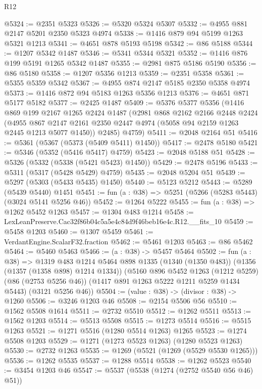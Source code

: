 \begin{lexlean}{R12}
\begin{coremodule}
@5324 := @2351 @5323
@5326 := @5320 @5324 @5307
@5332 := @4955 @881 @2147 @5201 @2350 @5323 @4974
@5338 := @1416 @879 @94 @5199 @1263 @5321 @1213
@5341 := @4651 @878 @5193 @5198
@5342 := @86 @5188
@5344 := @1207 @5342 @1487
@5346 := @5341 @5344 @5321
@5352 := @1416 @876 @199 @5191 @1265 @5342 @1487
@5355 := @2981 @875 @5186 @5190
@5356 := @86 @5180
@5358 := @1207 @5356 @1213
@5359 := @2351 @5358
@5361 := @5355 @5359 @5342
@5367 := @4955 @874 @2147 @5185 @2350 @5358 @4974
@5373 := @1416 @872 @94 @5183 @1263 @5356 @1213
@5376 := @4651 @871 @5177 @5182
@5377 := @2425 @1487
@5409 := @5376
    @5377
    @5356
    (@1416
      @869
      @199
      @2167
      @1265
      @2424
      @1487
      (@2981
        @868
        @2162
        @2166
        @2448
        @2424
        (@4955 @867 @2147 @2161 @2350 @2447 @4974 (@5058 @94 @2159 @1263 @2445 @1213 @5077 @1450))
        @2485)
      @4759)
@5411 := @2048 @2164 @51
@5416 := @5361 (@5367 (@5373 (@5409 @5411) @1450))
@5417 := @2478 @5180
@5421 := @5346 (@5352 (@5416 @5417) @4759)
@5423 := @2048 @5188 @51
@5428 := @5326 (@5332 (@5338 (@5421 @5423) @1450))
@5429 := @2478 @5196
@5433 := @5311 (@5317 (@5428 @5429) @4759)
@5435 := @2048 @5204 @51
@5439 := @5297 (@5303 (@5433 @5435) @1450)
@5440 := @5123 @5212
@5443 := @5289 (@5439 @5440) @1451
@5451 := fun (a : @38) => @5251 (@5266 (@5283 @5443) (@3024 @5141 @5256 @46))
@5452 := @1264 @5222
@5455 := fun (a : @38) => @1262 @5452 @1263
@5457 := @1304 @483 @1214
@5458 := LexLeanPreserve.Cac32f86b04c5a5e4c84d9f46beb16e4c.R12.__fits_10
@5459 := @5458 @1203
@5460 := @1307 @5459
@5461 := VerdantEngine.ScalarF32.fraction
@5462 := @5461 @1203
@5463 := @86 @5462
@5464 := @5460 @5463
@5466 := (a : @38) -> @5457 @5464
@5502 := fun (a : @38) =>
  @1319
    @483
    @1214
    @5464
    @898
    @1335
    (@1340 (@1350 @483))
    (@1356 (@1357 (@1358 @898) @1214 @1334))
    (@5160
      @896
      @5452
      @1263
      (@1212 @5259)
      (@86 (@2753 @5256 @46))
      (@1417 @891 @1263 @5222 @1211 @5259 @1434 @5443)
      (@3121 @5256 @46))
@5504 := (value : @38) -> (divisor : @38) -> @1260
@5506 := @3246 @1203 @46
@5508 := @2154 @5506 @56
@5510 := @1562 @5508 @1614
@5511 := @2732 @5510
@5512 := @1262 @5511
@5513 := @1562 @1203
@5514 := @5513 @5508
@5515 := @1273 @5514
@5516 := @5515 @1263
@5521 := @1271 @5516 (@1280 @5514 @1263) @1265
@5523 := @1274 @5508 @1203
@5529 := @1271 (@1273 @5523 @1263) (@1280 @5523 @1263)
@5530 := @2732 @1263
@5535 := @1269 (@5521 (@1269 (@5529 @5530 @1265)))
@5536 := @1262 @5535
@5537 := @1288 @5514
@5538 := @1262 @5523
@5540 := @3454 @1203 @46
@5547 := @5537 (@5538 (@1274 (@2752 @5540 @56 @46) @51))

\end{coremodule}
\end{lexlean}
